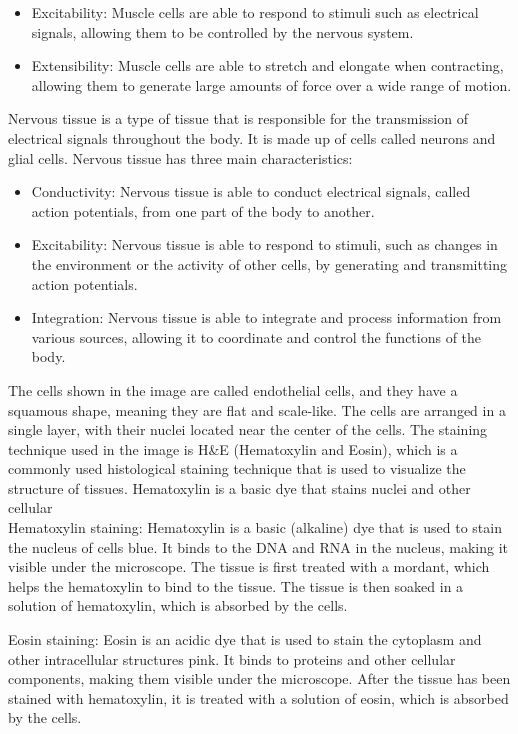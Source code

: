 \documentclass{article}
\begin{document}
\begin{itemize}
\begin{itemize}
\item Excitability: Muscle cells are able to respond to stimuli such as electrical signals, allowing them to be controlled by the nervous system.

\item Extensibility: Muscle cells are able to stretch and elongate when contracting, allowing them to generate large amounts of force over a wide range of motion.
\end{itemize}
Nervous tissue is a type of tissue that is responsible for the transmission of electrical signals throughout the body. It is made up of cells called neurons and glial cells. Nervous tissue has three main characteristics:\\
\begin{itemize}
\item Conductivity: Nervous tissue is able to conduct electrical signals, called action potentials, from one part of the body to another.

\item Excitability: Nervous tissue is able to respond to stimuli, such as changes in the environment or the activity of other cells, by generating and transmitting action potentials.

\item Integration: Nervous tissue is able to integrate and process information from various sources, allowing it to coordinate and control the functions of the body.
\end{itemize}
The cells shown in the image are called endothelial cells, and they have a squamous shape, meaning they are flat and scale-like. The cells are arranged in a single layer, with their nuclei located near the center of the cells. The staining technique used in the image is H\&E (Hematoxylin and Eosin), which is a commonly used histological staining technique that is used to visualize the structure of tissues. Hematoxylin is a basic dye that stains nuclei and other cellular\\

Hematoxylin staining: Hematoxylin is a basic (alkaline) dye that is used to stain the nucleus of cells blue. It binds to the DNA and RNA in the nucleus, making it visible under the microscope. The tissue is first treated with a mordant, which helps the hematoxylin to bind to the tissue. The tissue is then soaked in a solution of hematoxylin, which is absorbed by the cells.

Eosin staining: Eosin is an acidic dye that is used to stain the cytoplasm and other intracellular structures pink. It binds to proteins and other cellular components, making them visible under the microscope. After the tissue has been stained with hematoxylin, it is treated with a solution of eosin, which is absorbed by the cells.


\end{itemize}
\end{document}
